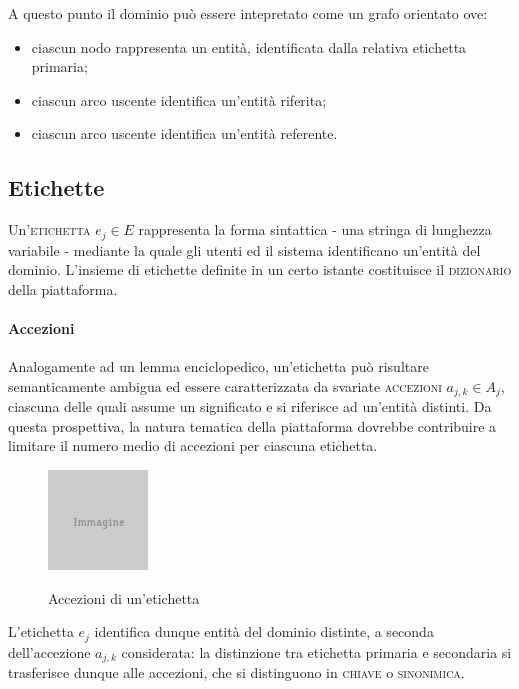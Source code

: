 A questo punto il dominio può essere intepretato come un grafo orientato ove:
\begin{itemize}
\item ciascun nodo rappresenta un entità, identificata dalla relativa etichetta primaria;
\item ciascun arco uscente identifica un'entità riferita;
\item ciascun arco uscente identifica un'entità referente.
\end{itemize}

\subsection{Etichette}
Un'\textsc{etichetta} $e_j \in E$ rappresenta la forma sintattica - una stringa di lunghezza variabile - mediante la quale gli utenti ed il sistema identificano un'entità del dominio. L'insieme di etichette definite in un certo istante costituisce il \textsc{dizionario} della piattaforma.

\paragraph{Accezioni}
Analogamente ad un lemma enciclopedico, un'etichetta può risultare semanticamente ambigua ed essere caratterizzata da svariate \textsc{accezioni} $a_{j,k} \in A_j$, ciascuna delle quali assume un significato e si riferisce ad un'entità distinti. Da questa prospettiva, la natura tematica della piattaforma dovrebbe contribuire a limitare il numero medio di accezioni per ciascuna etichetta.

\begin{figure}[ht]
\begin{center}
\includegraphics{placeholder.png}
\label{fig:tesi:stage:fase-uno:etichette-accezioni}
\caption{Accezioni di un'etichetta}
\end{center}
\end{figure}

L'etichetta $e_j$ identifica dunque entità del dominio distinte, a seconda dell'accezione $a_{j,k}$ considerata: la distinzione tra etichetta primaria e secondaria si trasferisce dunque alle accezioni, che si distinguono in \textsc{chiave} o \textsc{sinonimica}.

